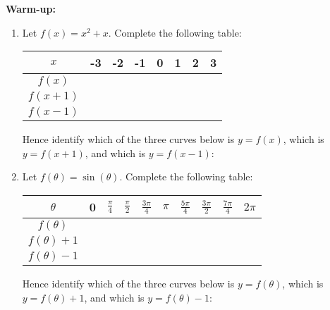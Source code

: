 \documentclass{article}
\begin{document}
\clearpage

{\bf Warm-up:}

\vspace{5mm}

\begin{enumerate}
\item Let $f(x)=x^2+x$. Complete the following table:

\begin{tabular}{c|c|c|c|c|c|c|c}
$x$ & -3 & -2 & -1 & 0 & 1 & 2 & 3\\ \hline
$f(x)$ & & & & & & & \\ \hline
$f(x+1)$ & & & & & & & \\ \hline
$f(x-1)$ & & & & & & &
\end{tabular}


Hence identify which of the three curves below is $y=f(x)$, which is $y=f(x+1)$, and which is $y=f(x-1)$:

\begin{center}
\end{center}

\item Let $f(\theta)=\sin(\theta)$. Complete the following table:

\begin{tabular}{c|c|c|c|c|c|c|c|c|c}
$\theta$ & 0 & $\frac{\pi}{4}$ & $\frac{\pi}{2}$ & $\frac{3\pi}{4}$ & $\pi$ & $\frac{5\pi}{4}$ & $\frac{3\pi}{2}$ & $\frac{7\pi}{4}$ & $2\pi$\\ \hline
$f(\theta)$ & & & & & & & & &\\ \hline
$f(\theta)+1$ & & & & & & & & &\\ \hline
$f(\theta)-1$ & & & & & & & & &
\end{tabular}


Hence identify which of the three curves below is $y=f(\theta)$, which is $y=f(\theta)+1$, and which is $y=f(\theta)-1$:


\end{enumerate}
\end{document}
